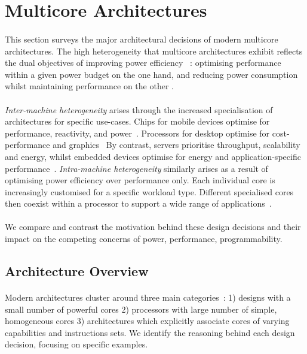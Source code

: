 
\section{Multicore Architectures}
\paragraph{}  This section surveys the major architectural decisions of modern multicore 
architectures. The high heterogeneity that multicore architectures exhibit
reflects the dual objectives of improving power efficiency ~\cite{borkar2011future}:
optimising performance within a given power budget on the one hand, 
and reducing power consumption whilst maintaining performance on the other .



\paragraph{} \emph{Inter-machine heterogeneity} arises through the
increased specialisation of architectures for specific use-cases. Chips for
mobile devices optimise for performance, reactivity, and power~\cite{hennessy2006comparchquantitative}.
Processors for desktop optimise for cost-performance and graphics~\cite{hennessy2006comparchquantitative}
By contrast, servers prioritise throughput, scalability and energy,
whilst embedded devices optimise for energy and application-specific
performance~\cite{hennessy2006comparchquantitative}. \emph {Intra-machine heterogeneity}  similarly arises as a result of optimising power efficiency over 
performance only. Each individual core is increasingly customised
for a specific workload type. Different specialised cores then coexist within
a processor to support a wide range of applications~\cite{5695539,balakrishnan2005impactperfasym}. 

\paragraph{} We compare and contrast the motivation behind these
design decisions and their impact on the competing
concerns of power, performance, programmability.

\subsection{Architecture Overview}

\paragraph{} Modern architectures cluster around three main categories~\cite{Vajda:1414193}: 1) designs with a small number of powerful cores 2) processors with large number of simple, homogeneous cores 3) architectures which explicitly associate cores of varying capabilities and instructions sets. We identify the
reasoning behind each design decision, focusing on specific examples.


